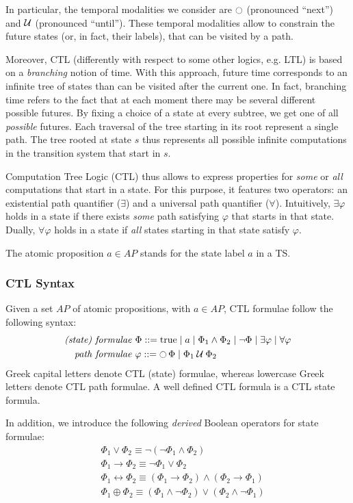 \documentclass{article}
\begin{document}
In particular, the temporal modalities we consider are $\ocircle$ (pronounced ``next'') and $\mathbin{\mathcal{U}}$ (pronounced ``until'').
These temporal modalities allow to constrain the future states (or, in fact, their labels), that can be visited by a path.

Moreover, CTL (differently with respect to some other logics, e.g. LTL) is based on a \emph{branching} notion of time. With this approach, future time corresponds to an infinite tree of states than can be visited after the current one. In fact, branching time refers to the fact that at each moment there may be several different possible futures. By fixing a choice of a state at every subtree, we get one of all \emph{possible} futures. 
Each traversal of the tree starting in its root represent a single path. The tree rooted at state $s$ thus represents all possible infinite computations in the transition system that start in $s$.

Computation Tree Logic (CTL) thus allows to express properties for \emph{some} or \emph{all} computations that start in a state. For this purpose, it features two operators: an existential path quantifier ($\exists$) and a universal path quantifier ($\forall$). Intuitively, $\exists \varphi$ holds in a state if there exists \emph{some} path satisfying $\varphi$ that starts in that state. Dually, $\forall \varphi$ holds in a state if \emph{all} states starting in that state satisfy $\varphi$.

The atomic proposition $a \in AP$ stands for the state label $a$ in a TS.

\subsubsection*{CTL Syntax}
Given a set $AP$ of atomic propositions, with $a \in AP$, CTL formulae follow the following syntax: 
\begin{align*}
    \emph{(state) formulae } & \Phi ::= \text{true} \mid a \mid \Phi_1 \land \Phi_2 \mid \neg \Phi \mid \exists \varphi \mid \forall \varphi \\
    \emph{path formulae   }    & \varphi ::= \mathop{\ocircle}{\Phi} \mid \Phi_1 \mathbin{\mathcal{U}} \Phi_2 \\
\end{align*}
Greek capital letters denote CTL (state) formulae, whereas lowercase Greek letters denote CTL path formulae. 
A well defined CTL formula is a CTL state formula.

In addition, we introduce the following \emph{derived} Boolean operators for state formulae: 
\begin{align*}
    &\; \Phi_1 \lor \Phi_2 \equiv \neg (\neg \Phi_1 \land \Phi_2) \\
    &\; \Phi_1 \rightarrow \Phi_2 \equiv \neg \Phi_1 \lor \Phi_2 \\
    &\; \Phi_1 \leftrightarrow  \Phi_2 \equiv (\Phi_1 \rightarrow \Phi_2) \land (\Phi_2 \rightarrow \Phi_1) \\
    &\; \Phi_1 \oplus  \Phi_2 \equiv (\Phi_1 \land \neg \Phi_2) \lor (\Phi_2 \land \neg \Phi_1)\\
\end{align*}
\end{document}
